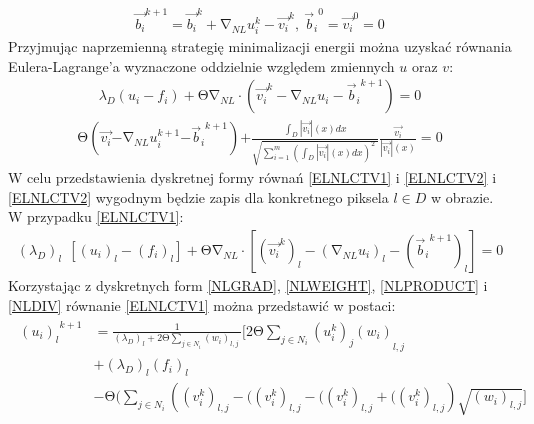\documentclass[12pt, twoside, openany]{report}
\theoremstyle{definition}
\begin{document}
\begin{align}
{\overrightarrow{b_i}}^{k+1}={\overrightarrow{b_i}}^k+{\mathrm{\nabla }}_{NL}u^k_i-{\overrightarrow{v_i}}^k,\ {{\overrightarrow{b}}_i}^0={\overrightarrow{v_i}}^0=0
\label{ENLCTV2}
\end{align}
Przyjmując naprzemienną strategię minimalizacji energii można uzyskać równania Eulera-Lagrange’a wyznaczone oddzielnie względem zmiennych $u$ oraz $v$:
\begin{align}
{\lambda }_D\left(u_i-f_i\right)+\mathrm{\Theta }{\mathrm{\nabla }}_{NL}\cdot \left({\overrightarrow{v_i}}^k-{\mathrm{\nabla }}_{NL}u_i-{{\overrightarrow{b}}_i}^{k+1}\right)=0
\label{ELNLCTV1}
\end{align}
\begin{align}
\mathrm{\Theta }\left(\overrightarrow{v_i}\mathrm{-}{\mathrm{\nabla }}_{NL}u^{k+1}_i\mathrm{-}{{\overrightarrow{b}}_i}^{k+1}\right)\mathrm{+}\frac{\int_D{\left|\overrightarrow{v_i}\right|(x)}dx}{\sqrt{\sum^m_{i=1}{{\left(\int_D{\left|\overrightarrow{v_i}\right|(x)}dx\right)}^2}\ }}\frac{\overrightarrow{v_i}}{\left|\overrightarrow{v_i}\right|(x)}\mathrm{=0}
\label{ELNLCTV2}
\end{align}
W celu przedstawienia dyskretnej formy równań \eqref{ELNLCTV1} i  \eqref{ELNLCTV2} i \eqref{ELNLCTV2} wygodnym będzie zapis dla konkretnego piksela $l\in D$ w obrazie. W przypadku \eqref{ELNLCTV1}: 
\begin{align}
{\left({\lambda }_D\right)}_l\ \ \left[{\left(u_i\right)}_l-{\left(f_i\right)}_l\right]+\mathrm{\Theta }{\mathrm{\nabla }}_{NL}\cdot \left[{\left({\overrightarrow{v_i}}^k\right)}_l-{\left({\mathrm{\nabla }}_{NL}u_i\right)}_l-{\left({{\overrightarrow{b}}_i}^{k+1}\right)}_l\right]=0
\label{DELNLCTV1}
\end{align}
Korzystając z dyskretnych form \eqref{NLGRAD}, \eqref{NLWEIGHT}, \eqref{NLPRODUCT} i \eqref{NLDIV} równanie \eqref{ELNLCTV1} można przedstawić w postaci:
\begin{align}
\begin{aligned}
{{\left(u_i\right)}_l}^{k+1} &= \frac{1}{{\left({\lambda }_D\right)}_l+2\mathrm{\Theta} \sum\limits_{j\in N_i} {\left(w_i\right)}_{l,j}\ } \Biggl[2\mathrm{\Theta }\sum_{j\in N_i} {{{\left(u^k_i\right)}_j\left(w_i\right)}_{l,j}\ }\\
&+ {\left({\lambda }_D\right)}_l{\left(f_i\right)}_l \\
&-\mathrm{\Theta} \Biggl( \sum_{j\in N_i} \left( \left({ v^k_i}\right)_{l,j} - (\left({ v^k_i}\right)_{l,j} - (\left({ v^k_i}\right)_{l,j} + (\left({ v^k_i}\right)_{l,j}\right) \sqrt{{\left(w_i\right)}_{l,j}} \Biggr]
\end{aligned}
\end{align}
\end{document}
